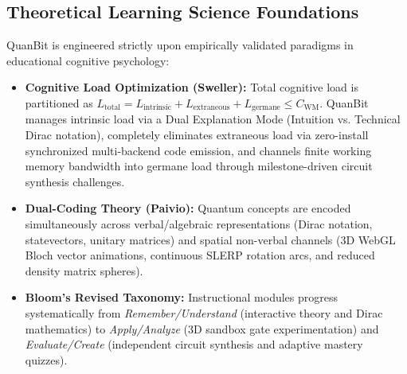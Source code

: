\documentclass[11pt, a4paper]{article}
\begin{document}
\subsection{Theoretical Learning Science Foundations}
QuanBit is engineered strictly upon empirically validated paradigms in educational cognitive psychology:
\begin{itemize}
	\item \textbf{Cognitive Load Optimization (Sweller):} Total cognitive load is partitioned as $L_{\text{total}} = L_{\text{intrinsic}} + L_{\text{extraneous}} + L_{\text{germane}} \le C_{\text{WM}}$. QuanBit manages intrinsic load via a Dual Explanation Mode (Intuition vs. Technical Dirac notation), completely eliminates extraneous load via zero-install synchronized multi-backend code emission, and channels finite working memory bandwidth into germane load through milestone-driven circuit synthesis challenges.
	\item \textbf{Dual-Coding Theory (Paivio):} Quantum concepts are encoded simultaneously across verbal/algebraic representations (Dirac notation, statevectors, unitary matrices) and spatial non-verbal channels (3D WebGL Bloch vector animations, continuous SLERP rotation arcs, and reduced density matrix spheres).
	\item \textbf{Bloom's Revised Taxonomy:} Instructional modules progress systematically from \textit{Remember/Understand} (interactive theory and Dirac mathematics) to \textit{Apply/Analyze} (3D sandbox gate experimentation) and \textit{Evaluate/Create} (independent circuit synthesis and adaptive mastery quizzes).
\end{itemize}
\end{document}
